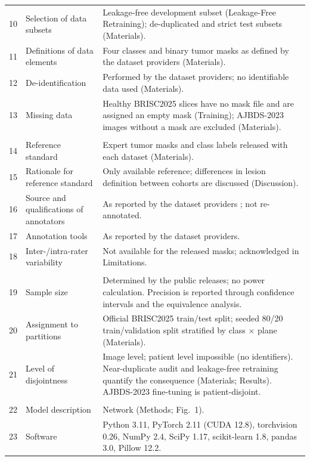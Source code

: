 \documentclass[10pt]{article}
\begin{document}
\begin{longtable}{>{\raggedright}p{0.6cm}>{\raggedright}p{6.6cm}>{\raggedright\arraybackslash}p{8.6cm}}
10 & Selection of data subsets & Leakage-free development subset (Leakage-Free Retraining); de-duplicated and strict test subsets (Materials). \\
11 & Definitions of data elements & Four classes and binary tumor masks as defined by the dataset providers (Materials). \\
12 & De-identification & Performed by the dataset providers; no identifiable data used (Materials). \\
13 & Missing data & Healthy BRISC2025 slices have no mask file and are assigned an empty mask (Training); AJBDS-2023 images without a mask are excluded (Materials). \\
\multicolumn{3}{l}{\textit{Methods: ground truth}} \\
14 & Reference standard & Expert tumor masks and class labels released with each dataset (Materials). \\
15 & Rationale for reference standard & Only available reference; differences in lesion definition between cohorts are discussed (Discussion). \\
16 & Source and qualifications of annotators & As reported by the dataset providers \cite{fateh2026brisc,amin2023ajbds}; not re-annotated. \\
17 & Annotation tools & As reported by the dataset providers. \\
18 & Inter-/intra-rater variability & Not available for the released masks; acknowledged in Limitations. \\
\multicolumn{3}{l}{\textit{Methods: data partitions}} \\
19 & Sample size & Determined by the public releases; no power calculation. Precision is reported through confidence intervals and the equivalence analysis. \\
20 & Assignment to partitions & Official BRISC2025 train/test split; seeded 80/20 train/validation split stratified by class $\times$ plane (Materials). \\
21 & Level of disjointness & Image level; patient level impossible (no identifiers). Near-duplicate audit and leakage-free retraining quantify the consequence (Materials; Results). AJBDS-2023 fine-tuning is patient-disjoint. \\
\multicolumn{3}{l}{\textit{Methods: model}} \\
22 & Model description & Network (Methods; Fig.~1). \\
23 & Software & Python 3.11, PyTorch 2.11 (CUDA 12.8), torchvision 0.26, NumPy 2.4, SciPy 1.17, scikit-learn 1.8, pandas 3.0, Pillow 12.2. \\

\end{longtable}
\end{document}
